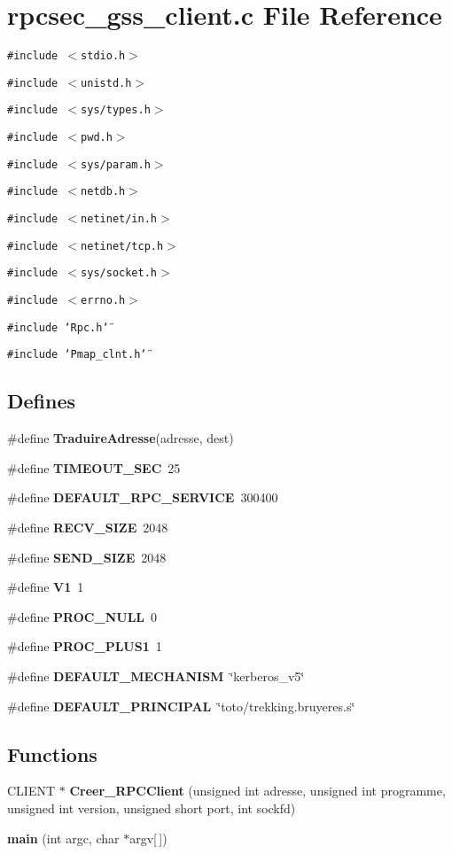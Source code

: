\section{rpcsec\_\-gss\_\-client.c File Reference}
\label{rpcsec__gss__client_8c}
{\tt \#include $<$stdio.h$>$}\par
{\tt \#include $<$unistd.h$>$}\par
{\tt \#include $<$sys/types.h$>$}\par
{\tt \#include $<$pwd.h$>$}\par
{\tt \#include $<$sys/param.h$>$}\par
{\tt \#include $<$netdb.h$>$}\par
{\tt \#include $<$netinet/in.h$>$}\par
{\tt \#include $<$netinet/tcp.h$>$}\par
{\tt \#include $<$sys/socket.h$>$}\par
{\tt \#include $<$errno.h$>$}\par
{\tt \#include \char`\"{}Rpc.h\char`\"{}}\par
{\tt \#include \char`\"{}Pmap\_\-clnt.h\char`\"{}}\par
\subsection*{Defines}
\begin{CompactItemize}
\item 
\#define {\bf Traduire\-Adresse}(adresse, dest)
\item 
\#define {\bf TIMEOUT\_\-SEC}\ 25
\item 
\#define {\bf DEFAULT\_\-RPC\_\-SERVICE}\ 300400
\item 
\#define {\bf RECV\_\-SIZE}\ 2048
\item 
\#define {\bf SEND\_\-SIZE}\ 2048
\item 
\#define {\bf V1}\ 1
\item 
\#define {\bf PROC\_\-NULL}\ 0
\item 
\#define {\bf PROC\_\-PLUS1}\ 1
\item 
\#define {\bf DEFAULT\_\-MECHANISM}\ \char`\"{}kerberos\_\-v5\char`\"{}
\item 
\#define {\bf DEFAULT\_\-PRINCIPAL}\ \char`\"{}toto/trekking.bruyeres.s\char`\"{}
\end{CompactItemize}
\subsection*{Functions}
\begin{CompactItemize}
\item 
CLIENT $\ast$ {\bf Creer\_\-RPCClient} (unsigned int adresse, unsigned int programme, unsigned int version, unsigned short port, int sockfd)
\item 
{\bf main} (int argc, char $\ast$argv[$\,$])
\end{CompactItemize}

